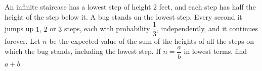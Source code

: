 An infinite staircase has a lowest step of height $2$ feet, and each step has half the height of the step below it. A bug stands on the lowest step. Every second it jumps up $1$, $2$ or $3$ steps, each with probability $\dfrac13$, independently, and it continues forever. Let $n$ be the expected value of the sum of the heights of all the steps on which the bug stands, including the lowest step. If $n=\dfrac ab$ in lowest terms, find $a+b$.
